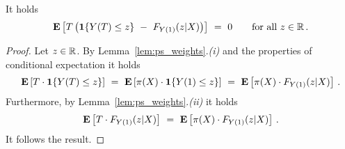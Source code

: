 \begin{lemma}
  It holds
  \begin{align*}
    \E
    \left[ 
      T
    \left( 
    \mathbf{1}{\left\{ Y(T) \le z \right\}}
    \ 
    -
    \ 
  F_{Y(1)}(z|X)
    \right)
    \right]
    \ 
    =
    \ 
    0
    \qquad
    \text{for all}\ 
    z\in\R
    \,.
  \end{align*}
\end{lemma}
\begin{proof}
  Let $z\in\mathbb{R}$.
  By Lemma~\ref{lem:ps_weights}.\textit{(i)} 
  and the properties of conditional expectation
  it holds
  \begin{align*}
    \E
    \left[ 
      T
      \cdot
    \mathbf{1}{\left\{ Y(T) \le z \right\}}
    \right]
    \ 
    =
    \ 
    \E
    \left[ 
      \pi(X)
      \cdot
    \mathbf{1}{\left\{ Y(1) \le z \right\}}
    \right]
    \ 
    =
    \ 
    \E
    \left[ 
      \pi(X)
      \cdot
      F_{Y(1)}(z|X)
    \right]
    \,.
  \end{align*}
  Furthermore,
  by Lemma~\ref{lem:ps_weights}.\textit{(ii)} 
  it holds
  \begin{align*}
    \E
    \left[ 
      T
      \cdot
  F_{Y(1)}(z|X)
    \right]
    \ 
    =
    \ 
    \E
    \left[ 
      \pi(X)
      \cdot
  F_{Y(1)}(z|X)
    \right]
    \,.
  \end{align*}
  It follows the result.
\end{proof}
